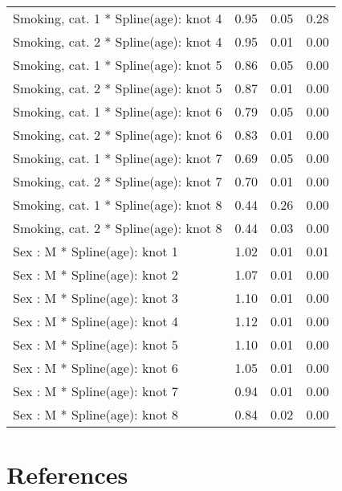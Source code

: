 \documentclass{article}
\begin{document}
\begin{longtable}{lrrr}
Smoking, cat. 1 * Spline(age): knot 4 & 0.95 & 0.05 & 0.28 \\ 
Smoking, cat. 2 * Spline(age): knot 4 & 0.95 & 0.01 & 0.00 \\ 
Smoking, cat. 1 * Spline(age): knot 5 & 0.86 & 0.05 & 0.00 \\ 
Smoking, cat. 2 * Spline(age): knot 5 & 0.87 & 0.01 & 0.00 \\ 
Smoking, cat. 1 * Spline(age): knot 6 & 0.79 & 0.05 & 0.00 \\ 
Smoking, cat. 2 * Spline(age): knot 6 & 0.83 & 0.01 & 0.00 \\ 
Smoking, cat. 1 * Spline(age): knot 7 & 0.69 & 0.05 & 0.00 \\ 
Smoking, cat. 2 * Spline(age): knot 7 & 0.70 & 0.01 & 0.00 \\ 
Smoking, cat. 1 * Spline(age): knot 8 & 0.44 & 0.26 & 0.00 \\ 
Smoking, cat. 2 * Spline(age): knot 8 & 0.44 & 0.03 & 0.00 \\ 
Sex : M * Spline(age): knot 1 & 1.02 & 0.01 & 0.01 \\ 
Sex : M * Spline(age): knot 2 & 1.07 & 0.01 & 0.00 \\ 
Sex : M * Spline(age): knot 3 & 1.10 & 0.01 & 0.00 \\ 
Sex : M * Spline(age): knot 4 & 1.12 & 0.01 & 0.00 \\ 
Sex : M * Spline(age): knot 5 & 1.10 & 0.01 & 0.00 \\ 
Sex : M * Spline(age): knot 6 & 1.05 & 0.01 & 0.00 \\ 
Sex : M * Spline(age): knot 7 & 0.94 & 0.01 & 0.00 \\ 
Sex : M * Spline(age): knot 8 & 0.84 & 0.02 & 0.00 \\ 
\bottomrule
\end{longtable}

\newpage

\hypertarget{references}{%
\section*{References}\label{references}}
\end{document}
